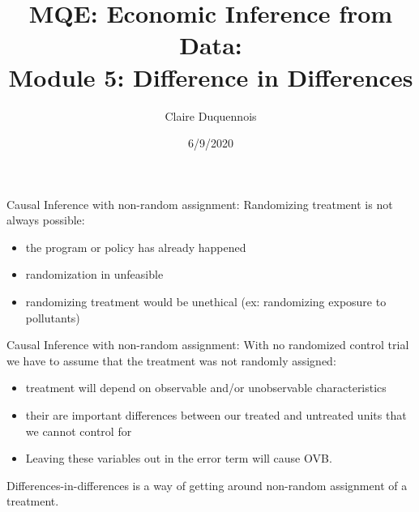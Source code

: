 \documentclass[
  ignorenonframetext,
]{beamer}
\title{MQE: Economic Inference from Data:\\
Module 5: Difference in Differences}
\author{Claire Duquennois}
\date{6/9/2020}
\begin{document}
\frame{\titlepage}

\begin{frame}{Causal Inference with non-random assignment:}
\protect\hypertarget{causal-inference-with-non-random-assignment}{}
Randomizing treatment is not always possible:

\begin{itemize}
\item
  the program or policy has already happened
\item
  randomization in unfeasible
\item
  randomizing treatment would be unethical (ex: randomizing exposure to
  pollutants)
\end{itemize}
\end{frame}

\begin{frame}{Causal Inference with non-random assignment:}
\protect\hypertarget{causal-inference-with-non-random-assignment-1}{}
With no randomized control trial we have to assume that the treatment
was not randomly assigned:

\begin{itemize}
\item
  treatment will depend on observable and/or unobservable
  characteristics
\item
  their are important differences between our treated and untreated
  units that we cannot control for
\item
  Leaving these variables out in the error term will cause OVB.
\end{itemize}

Differences-in-differences is a way of getting around non-random
assignment of a treatment.
\end{frame}

\end{document}
